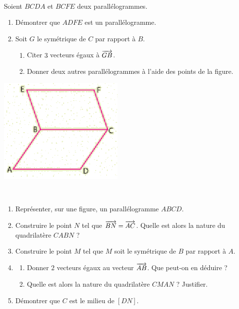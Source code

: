 \documentclass[11pt]{article}
\begin{document}
\begin{exo}~\\[-6mm]
  \begin{minipage}[]{.65\textwidth}
    Soient $BCDA$ et $BCFE$ deux parallélogrammes.
    \begin{enumerate}
      \item Démontrer que $ADFE$ est un parallélogramme.
      \item Soit $G$ le symétrique de $C$ par rapport à $B$.
        \begin{enumerate}
          \item Citer $3$ vecteurs égaux à $\overrightarrow{GB}$.
          \item Donner deux autres parallélogrammes à l'aide des points de la
            figure.
        \end{enumerate}
    \end{enumerate}
  \end{minipage}
  \begin{minipage}[]{.35\textwidth}
    \begin{center}
      \includegraphics[scale=.7]{sym.png}
    \end{center}
  \end{minipage}
\end{exo}

\begin{exo}~\\[-5mm]
  \begin{enumerate}
    \item Représenter, sur une figure, un parallélogramme $ABCD$.
    \item Construire le point $N$ tel que $\overrightarrow{BN}=\overrightarrow{AC}$. Quelle est
      alors la nature du quadrilatère $CABN$ ?
    \item Construire le point $M$ tel que $M$ soit le symétrique de $B$ par
      rapport à $A$.
    \item \begin{enumerate}
        \item Donner $2$ vecteurs égaux au vecteur $\overrightarrow{AB}$. Que peut-on en
          déduire ?
        \item Quelle est alors la nature du quadrilatère $CMAN$ ? Justifier.
      \end{enumerate}
    \item Démontrer que $C$ est le milieu de $\left[ DN \right]$.
  \end{enumerate}
\end{exo}
\end{document}
